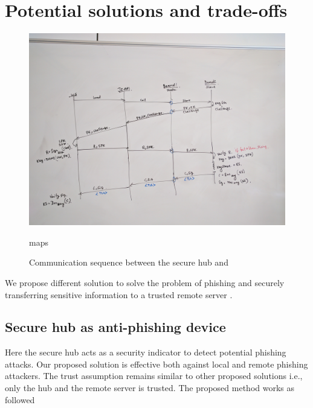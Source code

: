 \section{Potential solutions and trade-offs}
\label{sec:solution}


\begin{figure}[t]
\centering
        {\includegraphics[clip, width=\linewidth]{images/seq.jpg}}
    \caption{Communication sequence between the secure hub and \server}
    \label{fig:seq}maps
\end{figure}

We propose different solution to solve the problem of phishing and securely
transferring sensitive information to a trusted remote server \server.


\subsection{Secure hub as anti-phishing device}

Here the secure hub acts as a security indicator to detect potential phishing attacks. Our proposed solution is effective both against local and remote phishing attackers. The trust assumption remains similar to other proposed solutions i.e., only the hub and the remote server is trusted. The proposed method works as followed


